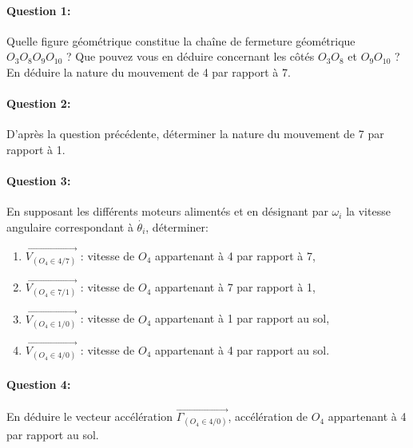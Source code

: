 
\paragraph{Question 1:} Quelle figure géométrique constitue la chaîne de fermeture géométrique $O_3O_8O_9O_{10}$ ? Que pouvez vous en déduire concernant les côtés $O_3O_8$ et $O_9O_{10}$ ? En déduire la nature du mouvement de 4 par rapport à 7.

\paragraph{Question 2:} D'après la question précédente, déterminer la nature du mouvement de 7 par rapport à 1.

\paragraph{Question 3:} En supposant les différents moteurs alimentés et en désignant par $\omega_{i}$ la vitesse angulaire correspondant à $\dot{\theta_i}$, déterminer:
\begin{enumerate}
 \item $\overrightarrow{V_{(O_4\in4/7)}}$ : vitesse de $O_4$ appartenant à 4 par rapport à 7,
 \item $\overrightarrow{V_{(O_4\in7/1)}}$ : vitesse de $O_4$ appartenant à 7 par rapport à 1,
 \item $\overrightarrow{V_{(O_4\in1/0)}}$ : vitesse de $O_4$ appartenant à 1 par rapport au sol,
 \item $\overrightarrow{V_{(O_4\in4/0)}}$ : vitesse de $O_4$ appartenant à 4 par rapport au sol.
\end{enumerate}

\paragraph{Question 4:} En déduire le vecteur accélération $\overrightarrow{\Gamma_{(O_4\in4/0)}}$, accélération de $O_4$ appartenant à 4 par rapport au sol.

